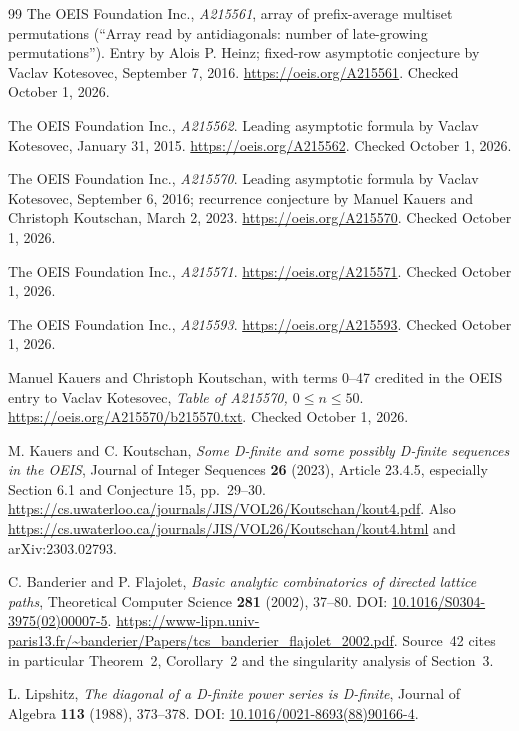 \documentclass[11pt,a4paper]{article}
\numberwithin{equation}{section}
\theoremstyle{definition}\newtheorem{definition}[theorem]{Definition}
\theoremstyle{remark}\newtheorem{remark}[theorem]{Remark}
\begin{document}
\begin{thebibliography}{99}
The OEIS Foundation Inc., \emph{A215561}, array of prefix-average multiset
permutations (``Array read by antidiagonals: number of late-growing
permutations''). Entry by Alois P. Heinz; fixed-row asymptotic conjecture by
Vaclav Kotesovec, September 7, 2016.
\url{https://oeis.org/A215561}. Checked October 1, 2026.

The OEIS Foundation Inc., \emph{A215562}. Leading asymptotic formula by
Vaclav Kotesovec, January 31, 2015.
\url{https://oeis.org/A215562}. Checked October 1, 2026.

The OEIS Foundation Inc., \emph{A215570}. Leading asymptotic formula by
Vaclav Kotesovec, September 6, 2016; recurrence conjecture by Manuel
Kauers and Christoph Koutschan, March 2, 2023.
\url{https://oeis.org/A215570}. Checked October 1, 2026.

The OEIS Foundation Inc., \emph{A215571}.
\url{https://oeis.org/A215571}. Checked October 1, 2026.

The OEIS Foundation Inc., \emph{A215593}.
\url{https://oeis.org/A215593}. Checked October 1, 2026.

Manuel Kauers and Christoph Koutschan, with terms 0--47 credited in the
OEIS entry to Vaclav Kotesovec, \emph{Table of A215570, $0\le n\le50$}.
\url{https://oeis.org/A215570/b215570.txt}. Checked October 1, 2026.

M. Kauers and C. Koutschan,
\emph{Some D-finite and some possibly D-finite sequences in the OEIS},
Journal of Integer Sequences \textbf{26} (2023), Article 23.4.5,
especially Section 6.1 and Conjecture 15, pp.~29--30.
\url{https://cs.uwaterloo.ca/journals/JIS/VOL26/Koutschan/kout4.pdf}.
Also \url{https://cs.uwaterloo.ca/journals/JIS/VOL26/Koutschan/kout4.html}
and arXiv:2303.02793.

C. Banderier and P. Flajolet,
\emph{Basic analytic combinatorics of directed lattice paths},
Theoretical Computer Science \textbf{281} (2002), 37--80.
DOI: \href{https://doi.org/10.1016/S0304-3975(02)00007-5}{10.1016/S0304-3975(02)00007-5}.
\url{https://www-lipn.univ-paris13.fr/~banderier/Papers/tcs_banderier_flajolet_2002.pdf}.
Source~42 cites in particular Theorem~2, Corollary~2 and the singularity
analysis of Section~3.

L. Lipshitz,
\emph{The diagonal of a D-finite power series is D-finite},
Journal of Algebra \textbf{113} (1988), 373--378.
DOI: \href{https://doi.org/10.1016/0021-8693(88)90166-4}{10.1016/0021-8693(88)90166-4}.


\end{thebibliography}
\end{document}
